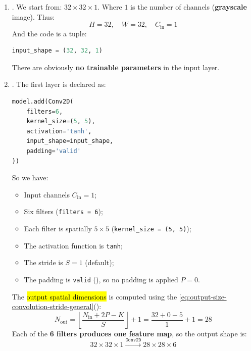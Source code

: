 \begin{enumerate}
    \item {}. We start from: $32 \times 32 \times 1$. Where $1$ is the number of channels (\textbf{grayscale} image). Thus:
    \begin{equation*}
        H = 32, \quad W = 32, \quad C_{\text{in}} = 1
    \end{equation*}
    And the code is a tuple:
    \begin{lstlisting}[language=Python]
input_shape = (32, 32, 1)
\end{lstlisting}
    There are obviously \textbf{no trainable parameters} in the input layer.


    \item {}. The first layer is declared as:
    \begin{lstlisting}[language=Python]
model.add(Conv2D(
    filters=6,
    kernel_size=(5, 5),
    activation='tanh',
    input_shape=input_shape,
    padding='valid'
))
\end{lstlisting}
    So we have:
    \begin{itemize}
        \item Input channels $C_{\text{in}} = 1$;
        \item Six filters (\texttt{filters = 6});
        \item Each filter is spatially $5 \times 5$ (\texttt{kernel\_size = (5, 5)});
        \item The activation function is \texttt{tanh};
        \item The stride is $S = 1$ (default);
        \item The padding is \texttt{valid} (), so no padding is applied $P = 0$.
    \end{itemize}
    The \hl{output spatial dimensions} is computed using the \autoref{eq:output-size-convolution-stride-general}\break ():
    \begin{equation*}
        N_{\text{out}} = \left\lfloor \frac{N_{\text{in}} + 2P - K}{S} \right\rfloor + 1 = \frac{32 + 0  - 5}{1} + 1 = 28
    \end{equation*}
    Each of the \textbf{6 filters produces one feature map}, so the output shape is:
    \begin{equation*}
        32 \times 32 \times 1 \xrightarrow{\texttt{Conv2D}} 28 \times 28 \times 6
    \end{equation*}

\end{enumerate}
